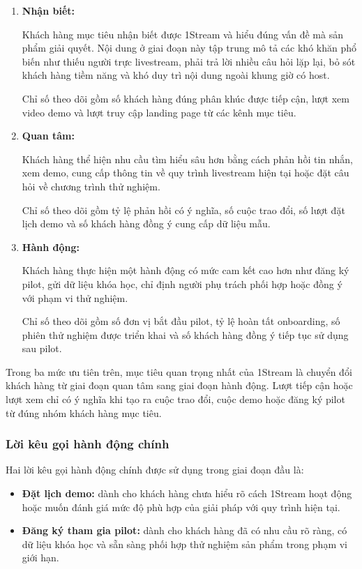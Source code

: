 \begin{enumerate}
    \item \textbf{Nhận biết:}

    Khách hàng mục tiêu nhận biết được 1Stream và hiểu đúng vấn đề mà sản phẩm giải quyết. Nội dung ở giai đoạn này tập trung mô tả các khó khăn phổ biến như thiếu người trực livestream, phải trả lời nhiều câu hỏi lặp lại, bỏ sót khách hàng tiềm năng và khó duy trì nội dung ngoài khung giờ có host.

    Chỉ số theo dõi gồm số khách hàng đúng phân khúc được tiếp cận, lượt xem video demo và lượt truy cập landing page từ các kênh mục tiêu.

    \item \textbf{Quan tâm:}

    Khách hàng thể hiện nhu cầu tìm hiểu sâu hơn bằng cách phản hồi tin nhắn, xem demo, cung cấp thông tin về quy trình livestream hiện tại hoặc đặt câu hỏi về chương trình thử nghiệm.

    Chỉ số theo dõi gồm tỷ lệ phản hồi có ý nghĩa, số cuộc trao đổi, số lượt đặt lịch demo và số khách hàng đồng ý cung cấp dữ liệu mẫu.

    \item \textbf{Hành động:}

    Khách hàng thực hiện một hành động có mức cam kết cao hơn như đăng ký pilot, gửi dữ liệu khóa học, chỉ định người phụ trách phối hợp hoặc đồng ý với phạm vi thử nghiệm.

    Chỉ số theo dõi gồm số đơn vị bắt đầu pilot, tỷ lệ hoàn tất onboarding, số phiên thử nghiệm được triển khai và số khách hàng đồng ý tiếp tục sử dụng sau pilot.
\end{enumerate}

Trong ba mức ưu tiên trên, mục tiêu quan trọng nhất của 1Stream là chuyển đổi khách hàng từ giai đoạn quan tâm sang giai đoạn hành động. Lượt tiếp cận hoặc lượt xem chỉ có ý nghĩa khi tạo ra cuộc trao đổi, cuộc demo hoặc đăng ký pilot từ đúng nhóm khách hàng mục tiêu.

\subsubsection{Lời kêu gọi hành động chính}

Hai lời kêu gọi hành động chính được sử dụng trong giai đoạn đầu là:

\begin{itemize}
    \item \textbf{Đặt lịch demo:} dành cho khách hàng chưa hiểu rõ cách 1Stream hoạt động hoặc muốn đánh giá mức độ phù hợp của giải pháp với quy trình hiện tại.

    \item \textbf{Đăng ký tham gia pilot:} dành cho khách hàng đã có nhu cầu rõ ràng, có dữ liệu khóa học và sẵn sàng phối hợp thử nghiệm sản phẩm trong phạm vi giới hạn.
\end{itemize}

